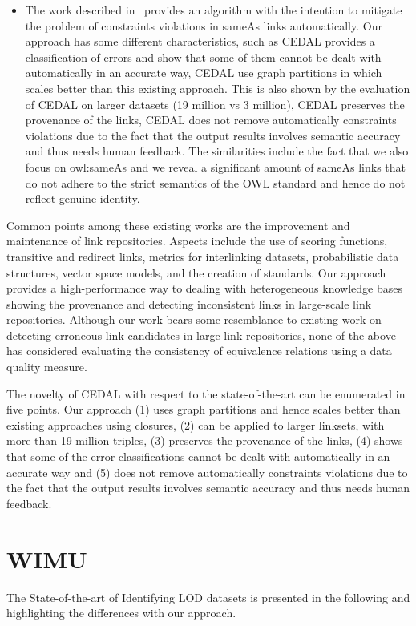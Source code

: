 \begin{itemize}
	\item The work described in~\cite{Melo2013NotQT} provides an algorithm with the intention to mitigate the problem of constraints violations in sameAs links automatically. Our approach has some different characteristics, such as CEDAL provides a classification of errors and show that some of them cannot be dealt with automatically in an accurate way, CEDAL use graph partitions in which scales better than this existing approach. This is also shown by the evaluation of CEDAL on larger datasets (19 million vs 3 million), CEDAL preserves the provenance of the links,  CEDAL does not remove automatically constraints violations due to the fact that the output results involves semantic accuracy and thus needs human feedback. The similarities include the fact that we also focus on owl:sameAs and we reveal a significant amount of sameAs links that do not adhere to the strict semantics of the OWL standard and hence do not reflect genuine identity.
\end{itemize}
%
Common points among these existing works are the improvement and maintenance of link repositories. Aspects include the use of scoring functions, transitive and redirect links, metrics for interlinking datasets, probabilistic data structures, vector space models, and the creation of standards. Our approach provides a high-performance way to dealing with heterogeneous knowledge bases showing the provenance and detecting inconsistent links in large-scale link repositories. 
Although our work bears some resemblance to existing work on detecting erroneous link candidates in large link repositories, none of the above has considered evaluating the consistency of equivalence relations using a data quality measure. %

The novelty of CEDAL with respect to the state-of-the-art can be enumerated in five points. Our approach (1) uses graph partitions and hence scales better than existing approaches using closures, (2) can be applied to larger linksets, with more than 19 million triples, (3) preserves the provenance of the links, (4) shows that some of the error classifications cannot be dealt with automatically in an accurate way and (5) does not remove automatically constraints violations due to the fact that the output results involves semantic accuracy and thus needs human feedback.

\section{WIMU}
The State-of-the-art of Identifying LOD datasets is presented in the following and highlighting the differences with our approach.

